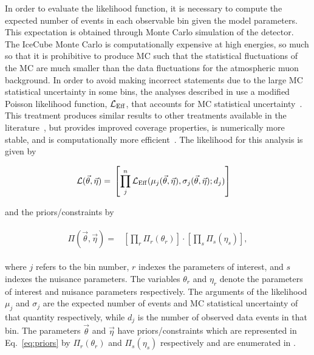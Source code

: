 In order to evaluate the likelihood function, it is necessary to compute the expected number of events in each observable bin given the model parameters.
This expectation is obtained through Monte Carlo simulation of the detector.
The IceCube Monte Carlo is computationally expensive at high energies, so much so that it is prohibitive to produce MC such that the statistical fluctuations of the MC are much smaller than the data fluctuations for the atmospheric muon background.
In order to avoid making incorrect statements due to the large MC statistical uncertainty in some bins, the analyses described in  use a modified Poisson likelihood function, $\mathcal{L}_{\rm Eff}$, that accounts for MC statistical uncertainty~\cite{Arguelles:2019izp}.
This treatment produces similar results to other treatments available in the literature~\cite{Chirkin:2013lya,Glusenkamp:2017rlp,Glusenkamp:2019uir}, but provides improved coverage properties, is numerically more stable, and is computationally more efficient~\cite{Arguelles:2019izp}.
The likelihood for this analysis is given by
\begin{linenomath}
	\begin{align}
	\begin{split}
	\mathcal{L}(\vec\theta, \vec\eta) ={}& \left[\prod_j^{n} \mathcal{L}_{\rm Eff}(\mu_j(\vec\theta,\vec\eta), \sigma_j(\vec\theta,\vec\eta); d_j) \right]\label{eq:likelihood}
	\end{split}
	\end{align}
\end{linenomath}
and the priors/constraints by
\begin{linenomath}
	\begin{align}
	\begin{split}
	\Pi(\vec\theta, \vec\eta)={}& \left[\prod_r \Pi_r(\theta_r)\right] \cdot \left[\prod_s \Pi_s(\eta_s) \right],\label{eq:priors}
	\end{split}
	\end{align}
\end{linenomath}
where $j$ refers to the bin number, $r$ indexes the parameters of interest, and $s$ indexes the nuisance parameters.
The variables $\theta_r$ and $\eta_r$ denote the parameters of interest and nuisance parameters respectively.
The arguments of the likelihood $\mu_j$ and $\sigma_j$ are the expected number of events and MC statistical uncertainty of that quantity respectively, while $d_j$ is the number of observed data events in that bin.
The parameters $\vec\theta$ and $\vec\eta$ have priors/constraints which are represented in Eq.~\eqref{eq:priors} by $\Pi_r(\theta_r)$ and $\Pi_s(\eta_s)$ respectively and are enumerated in .
